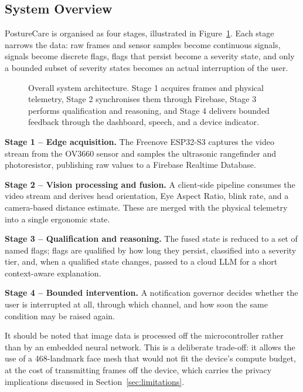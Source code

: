 \subsection{System Overview}
\label{subsec:overview}

PostureCare is organised as four stages, illustrated in Figure~\ref{fig:architecture}. Each stage
narrows the data: raw frames and sensor samples become continuous signals, signals become discrete
flags, flags that persist become a severity state, and only a bounded subset of severity states
becomes an actual interruption of the user.

\begin{figure}[!ht]
    \centering
    \caption{Overall system architecture. Stage 1 acquires frames and physical telemetry, Stage 2
    synchronises them through Firebase, Stage 3 performs qualification and reasoning, and Stage 4
    delivers bounded feedback through the dashboard, speech, and a device indicator.}
    \label{fig:architecture}
\end{figure}

\textbf{Stage 1 -- Edge acquisition.} The Freenove ESP32-S3 captures the video stream from the
OV3660 sensor and samples the ultrasonic rangefinder and photoresistor, publishing raw values to a
Firebase Realtime Database.

\textbf{Stage 2 -- Vision processing and fusion.} A client-side pipeline consumes the video stream
and derives head orientation, Eye Aspect Ratio, blink rate, and a camera-based distance estimate.
These are merged with the physical telemetry into a single ergonomic state.

\textbf{Stage 3 -- Qualification and reasoning.} The fused state is reduced to a set of named
flags; flags are qualified by how long they persist, classified into a severity tier, and, when a
qualified state changes, passed to a cloud LLM for a short context-aware explanation.

\textbf{Stage 4 -- Bounded intervention.} A notification governor decides whether the user is
interrupted at all, through which channel, and how soon the same condition may be raised again.

It should be noted that image data is processed off the microcontroller rather than by an embedded
neural network. This is a deliberate trade-off: it allows the use of a 468-landmark face mesh that
would not fit the device's compute budget, at the cost of transmitting frames off the device, which
carries the privacy implications discussed in Section~\ref{sec:limitations}.

